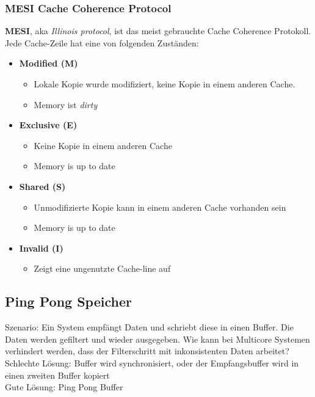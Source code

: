 \subsubsection{MESI Cache Coherence Protocol}
\textbf{MESI}, aka \textit{Illinois protocol}, ist das meist gebrauchte Cache Coherence Protokoll.\\
Jede Cache-Zeile hat eine von folgenden Zust\"anden:
\begin{multicols}{2}
	\begin{itemize}
	\item \textbf{Modified (M)}
	\begin{itemize}
		\item Lokale Kopie wurde modifiziert, keine Kopie in einem anderen Cache.
		\item Memory ist \textit{dirty}
	\end{itemize}
	\item \textbf{Exclusive (E)}
	\begin{itemize}
		\item Keine Kopie in einem anderen Cache
		\item Memory is up to date
	\end{itemize}
	\vfill\null
	\columnbreak
	\item \textbf{Shared (S)}
	\begin{itemize}
		\item Unmodifizierte Kopie kann in einem anderen Cache vorhanden sein
		\item Memory is up to date
	\end{itemize}
	\item \textbf{Invalid (I)}
	\begin{itemize}
		\item Zeigt eine ungenutzte Cache-line auf
	\end{itemize}
\end{itemize}
\end{multicols}
\subsection{Ping Pong Speicher}
Szenario: Ein System empfängt Daten und schriebt diese in einen Buffer. Die Daten werden gefiltert und wieder ausgegeben. Wie kann bei Multicore Systemen verhindert werden, dass der Filterschritt mit inkonsistenten Daten arbeitet? \\
Schlechte Lösung: Buffer wird synchronisiert, oder der Empfangsbuffer wird in einen zweiten Buffer kopiert \\
Gute Lösung: Ping Pong Buffer

